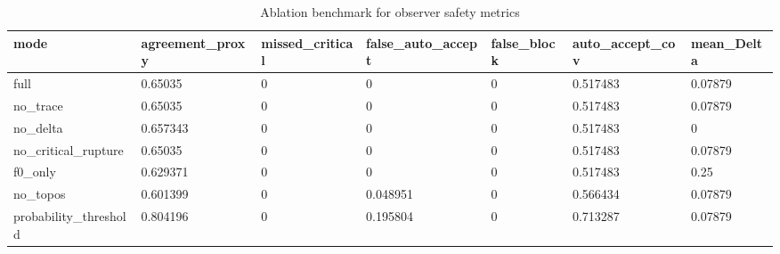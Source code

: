 \begin{table}[h]
\centering
\caption{Ablation benchmark for observer safety metrics}
\label{tab:ablation}
\begin{tabular}{|l|l|l|l|l|l|l|}
\hline
mode & agreement\_proxy & missed\_critical & false\_auto\_accept & false\_block & auto\_accept\_cov & mean\_Delta \\
\hline
full & 0.65035 & 0 & 0 & 0 & 0.517483 & 0.07879 \\
\hline
no\_trace & 0.65035 & 0 & 0 & 0 & 0.517483 & 0.07879 \\
\hline
no\_delta & 0.657343 & 0 & 0 & 0 & 0.517483 & 0 \\
\hline
no\_critical\_rupture & 0.65035 & 0 & 0 & 0 & 0.517483 & 0.07879 \\
\hline
f0\_only & 0.629371 & 0 & 0 & 0 & 0.517483 & 0.25 \\
\hline
no\_topos & 0.601399 & 0 & 0.048951 & 0 & 0.566434 & 0.07879 \\
\hline
probability\_threshold & 0.804196 & 0 & 0.195804 & 0 & 0.713287 & 0.07879 \\
\hline
\end{tabular}
\end{table}
